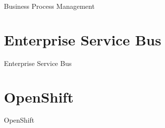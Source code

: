 Business Process Management


\section{Enterprise Service Bus}
\label{sec:esb}

Enterprise Service Bus


\section{OpenShift}
\label{sec:openShift}

OpenShift

